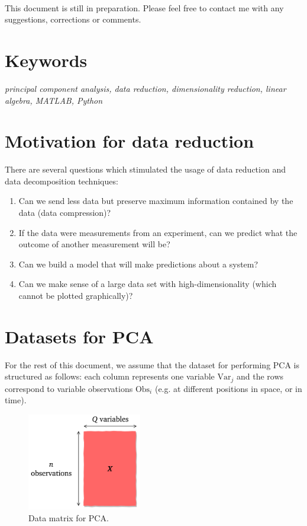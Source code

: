 \documentclass[10pt,twocolumn]{article}
\begin{document}
\,\,

This document is still in preparation. Please feel free to contact me with any suggestions, corrections or comments.

\section*{Keywords}

\textit{principal component analysis, data reduction, dimensionality reduction, linear algebra, MATLAB\textregistered, Python}

\tableofcontents

\section{Motivation for data reduction}

There are several questions which stimulated the usage of data reduction and data decomposition techniques:

\begin{enumerate}
\item Can we send less data but preserve maximum information contained by the data (data compression)?

\item If the data were measurements from an experiment, can we predict what the outcome of another measurement will be?

\item Can we build a model that will make predictions about a system?

\item Can we make sense of a large data set with high-dimensionality (which cannot be plotted graphically)?
\end{enumerate}

\section{Datasets for PCA}

For the rest of this document, we assume that the dataset for performing PCA is structured as follows: each column represents one variable $\text{Var}_j$ and the rows correspond to variable observations $\text{Obs}_i$ (e.g. at different positions in space, or in time).

\begin{figure}[H]
\centering\includegraphics[width=5cm]{data-set-PCA.png}
\caption{Data matrix for PCA.}
\label{fig:data-matrix}
\end{figure}
\end{document}
